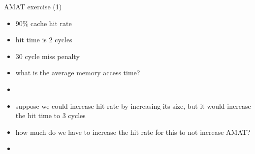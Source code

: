 \begin{frame}{AMAT exercise (1)}
\begin{itemize}
\item 90\% cache hit rate
\item hit time is 2 cycles
\item 30 cycle miss penalty
\item what is the average memory access time?
\item<2-> \iftoggle{heldback}{}{5 cycles}
\vspace{.5cm}
\item suppose we could increase hit rate by increasing its size, but it would increase the hit time to 3 cycles
\item how much do we have to increase the hit rate for this to not increase AMAT?
\item<3-> \iftoggle{heldback}{}{miss rate of 2/30 $\rightarrow$ approx 93\% hit rate}
\end{itemize}
\end{frame}
